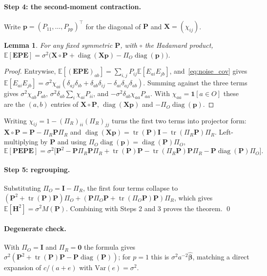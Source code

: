 \documentclass[11pt]{article}
\theoremstyle{definition}
\theoremstyle{plain}
\newtheorem{lemma}{Lemma}[section]
\newcommand{\E}{\mathbb{E}}
\newcommand{\bbeta}{\boldsymbol{\beta}}
\newcommand{\bP}{\mathbf{P}}
\newcommand{\bE}{\mathbf{E}}
\newcommand{\bH}{\mathbf{H}}
\newcommand{\bI}{\mathbf{I}}
\newcommand{\PiR}{\Pi_{R}}
\newcommand{\PiO}{\Pi_{O}}
\DeclareMathOperator{\tr}{tr}
\DeclareMathOperator{\diag}{diag}
\begin{document}
\paragraph{Step 4: the second-moment contraction.}
Write $\mathbf{p} = (P_{11}, \dots, P_{pp})^{\top}$ for the diagonal of $\bP$ and $\mathbf{X} = (\chi_{ij})$.

\begin{lemma}
For any fixed symmetric $\bP$, with $\circ$ the Hadamard product,
$\E[\bE\bP\bE] = \sigma^{2}\bigl(\mathbf{X} \circ \bP + \diag(\mathbf{X}\mathbf{p}) - \PiO\diag(\mathbf{p})\bigr)$.
\end{lemma}

\begin{proof}
Entrywise, $\E[(\bE\bP\bE)_{ab}] = \sum_{i,j} P_{ij}\E[E_{ai}E_{jb}]$, and~\eqref{eq:noise_cov} gives $\E[E_{ai}E_{jb}] = \sigma^{2}\chi_{ai}(\delta_{aj}\delta_{ib} + \delta_{ab}\delta_{ij} - \delta_{ai}\delta_{aj}\delta_{ab})$. Summing against the three terms gives $\sigma^{2}\chi_{ab}P_{ab}$, $\sigma^{2}\delta_{ab}\sum_{i}\chi_{ai}P_{ii}$, and $-\sigma^{2}\delta_{ab}\chi_{aa}P_{aa}$. With $\chi_{aa} = \mathbf{1}[a \in O]$ these are the $(a,b)$ entries of $\mathbf{X} \circ \bP$, $\diag(\mathbf{X}\mathbf{p})$ and $-\PiO\diag(\mathbf{p})$.
\end{proof}

Writing $\chi_{ij} = 1 - (\PiR)_{ii}(\PiR)_{jj}$ turns the first two terms into projector form: $\mathbf{X} \circ \bP = \bP - \PiR\bP\PiR$ and $\diag(\mathbf{X}\mathbf{p}) = \tr(\bP)\bI - \tr(\PiR\bP)\PiR$. Left-multiplying by $\bP$ and using $\PiO\diag(\mathbf{p}) = \diag(\bP)\PiO$,
\[
  \E[\bP\bE\bP\bE] = \sigma^{2}\bigl[\bP^{2} - \bP\PiR\bP\PiR + \tr(\bP)\bP - \tr(\PiR\bP)\bP\PiR - \bP\diag(\bP)\PiO\bigr].
\]

\paragraph{Step 5: regrouping.}
Substituting $\PiO = \bI - \PiR$, the first four terms collapse to $(\bP^{2} + \tr(\bP)\bP)\PiO + (\bP\PiO\bP + \tr(\PiO\bP)\bP)\PiR$, which gives $\E[\bH^{2}] = \sigma^{2}M(\bP)$. Combining with Steps 2 and 3 proves the theorem. \qed

\paragraph{Degenerate check.}
With $\PiO = \bI$ and $\PiR = \mathbf{0}$ the formula gives $\sigma^{2}(\bP^{2} + \tr(\bP)\bP - \bP\diag(\bP))$; for $p = 1$ this is $\sigma^{2}a^{-2}\hat{\bbeta}$, matching a direct expansion of $c/(a + e)$ with $\mathrm{Var}(e) = \sigma^{2}$.
\end{document}
